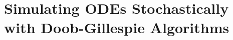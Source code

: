 \documentclass{SIAMbook2019}
\begin{document}
\setcounter{chapter}{16}%
\chapter[Doob-Gillespie Stochastic Simulation]{Simulating ODEs Stochastically with Doob-Gillespie Algorithms}

\end{document}
